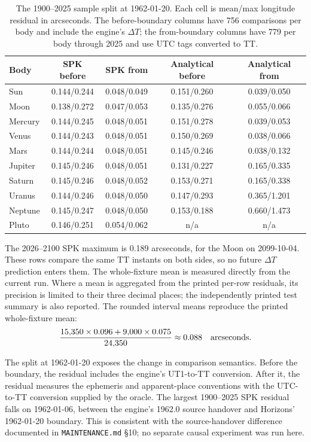 \documentclass[11pt]{article}
\begin{document}
\begin{table}[!htbp]
\centering
\small
\begin{tabular}{@{}lcccc@{}}
\toprule
Body & SPK before & SPK from & Analytical before & Analytical from \\
\midrule
Sun & 0.144/0.244 & 0.048/0.049 & 0.151/0.260 & 0.039/0.050 \\
Moon & 0.138/0.272 & 0.047/0.053 & 0.135/0.276 & 0.055/0.066 \\
Mercury & 0.144/0.245 & 0.048/0.051 & 0.151/0.278 & 0.039/0.053 \\
Venus & 0.144/0.243 & 0.048/0.051 & 0.150/0.269 & 0.038/0.066 \\
Mars & 0.144/0.244 & 0.048/0.051 & 0.145/0.246 & 0.038/0.132 \\
Jupiter & 0.145/0.246 & 0.048/0.051 & 0.131/0.227 & 0.165/0.335 \\
Saturn & 0.145/0.246 & 0.048/0.052 & 0.153/0.271 & 0.165/0.338 \\
Uranus & 0.144/0.246 & 0.048/0.050 & 0.147/0.293 & 0.365/1.201 \\
Neptune & 0.145/0.247 & 0.048/0.050 & 0.153/0.188 & 0.660/1.473 \\
Pluto & 0.146/0.251 & 0.054/0.062 & n/a & n/a \\
\bottomrule
\end{tabular}
\caption{The 1900--2025 sample split at 1962-01-20. Each cell is mean/max longitude
residual in arcseconds. The before-boundary columns have 756 comparisons per body
and include the engine's $\Delta T$; the from-boundary columns have 779 per body
through 2025 and use UTC tags converted to TT.}
\label{tab:timesplit}
\end{table}

The 2026--2100 SPK maximum is 0.189 arcseconds, for the Moon on
2099-10-04. These rows compare the same TT instants on both sides, so no future
$\Delta T$ prediction enters them.
The whole-fixture mean is measured directly from the current run. Where a mean is aggregated from
the printed per-row residuals, its precision is limited to their three decimal
places; the independently printed test summary is also reported. The rounded interval
means reproduce the printed whole-fixture mean:
\[
 \frac{15{,}350\times0.096+9{,}000\times0.075}{24{,}350}\approx0.088
 \quad\hbox{arcseconds}.
\]

The split at 1962-01-20 exposes the change in comparison semantics.
Before the boundary, the residual includes the engine's UT1-to-TT conversion.
After it, the residual measures the ephemeris and apparent-place conventions with
the UTC-to-TT conversion supplied by the oracle.
The largest 1900--2025 SPK residual falls on 1962-01-06, between the engine's
1962.0 source handover and Horizons' 1962-01-20 boundary.
This is consistent with the source-handover difference documented in
\texttt{MAINTENANCE.md} \S10; no separate causal experiment was run here.
\end{document}
